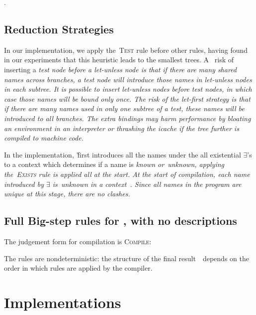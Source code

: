 \documentclass[article,screen,12pt, nonacm]{acmart}
\begin{document}
    .

    

      \subsection{Reduction Strategies}

      In our implementation, we apply the~\textsc{Test} rule before other rules,
      having found in our experiments that this heuristic leads to the smallest trees. A~%
      risk of inserting a \it{test} node before a \it{let-unless} node is that
      if there are many shared names across branches, a \it{test} node
      will introduce those names in \it{let-unless} nodes in each
      subtree.
      It is possible to insert \it{let-unless} nodes before \it{test}
      nodes, in which case those names will be bound
      only once.  The risk of the \it{let}-first strategy
      is that if there are many names used in only one subtree of a \it{test},
      these names will be introduced to \it{all} branches.  The extra
      bindings may harm
      performance by bloating an environment in an interpreter or thrashing the
      icache if the tree further is compiled to machine code. 

      In the implementation,~\DTran\~first introduces all the names under the
      all existential $\exists$'s to a context which determines if a name is
      \it{known} or~\it{unknown}, applying the~\textsc{Exists} rule is applied
      all at the start. At the start of compilation, each name introduced by
      $\exists$ is~\it{unknown} in a context~\ctx. Since all names in the
      program are unique at this stage, there are no clashes. 

      \subsection{Full Big-step rules for \Compile, with no descriptions}

        The judgement form for compilation is \textsc{Compile}: 


The rules are nondeterministic: the structure of the final result~\expr\ depends
on the order in which rules are applied by the compiler.  

\rawcompiler


    \section{Implementations}
\end{document}
